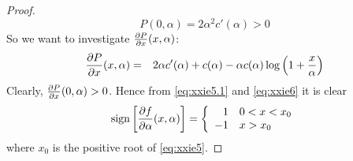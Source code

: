 \begin{subappendices}
\begin{proof}
  \begin{equation}
    \label{eq:xxie5.1}
    P(0, \alpha) = 2 \alpha^2 c'(\alpha) > 0
  \end{equation}
  So we want to investigate ${\partial P \over \partial x}(x, \alpha)$:
  \begin{eqnarray}
    {\partial P \over \partial x}(x, \alpha) &=&
    2 \alpha c'(\alpha) + c(\alpha) - \alpha c(\alpha) \log\left(
      1 + {x \over \alpha}
    \right)
    \label{eq:xxie6}
  \end{eqnarray}
  Clearly, $\frac{\partial P}{\partial x}(0, \alpha) > 0$. Hence from
  \eqref{eq:xxie5.1} and
  \eqref{eq:xxie6} it is clear
  \begin{equation*}
    \text{sign}\left[
      {\partial f \over \partial\alpha}(x, \alpha)
    \right]
    = \left\{
    \begin{array}{rl}
      1 & 0 < x < x_0 \\
      -1 & x > x_0
    \end{array}
    \right.
  \end{equation*}
  where $x_0$ is the positive root of \eqref{eq:xxie5}.
\end{proof}


\end{subappendices}
